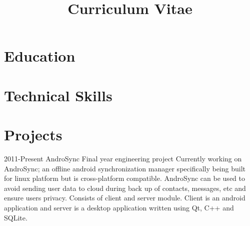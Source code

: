 \documentclass[11pt,a4paper]{moderncv}
\title{Curriculum Vitae}               %
\begin{document}
\maketitle


\section{Education}



\section{Technical Skills} 
 {}{}



\section{Projects}
\cventry
{2011-Present}
{AndroSync}
{Final year engineering project}
{}
{}
{Currently working on AndroSync; an offline android synchronization manager specifically being built for linux platform but is cross-platform 
compatible. AndroSync can be used to avoid sending user data to cloud during back up of contacts, messages, etc and ensure users privacy. 
Consists of client and server module. Client is an android application and server is a desktop application written using Qt, C++ and SQLite.}
\end{document}
